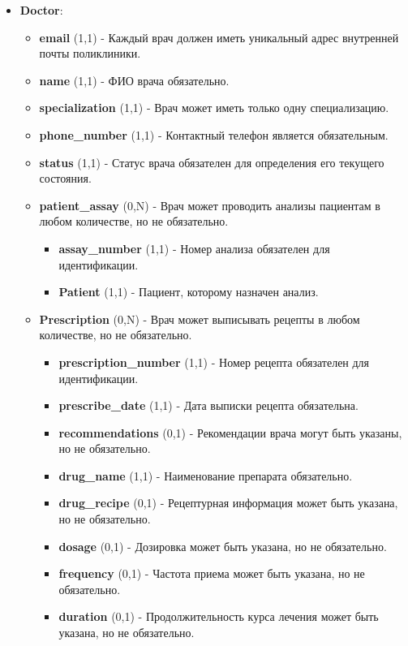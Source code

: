 \documentclass[a4paper, 14pt]{extarticle}
\begin{document}
\begin{itemize}
    \item \textbf{Doctor}: 
    \begin{itemize}
        \item \textbf{email} (1,1) - Каждый врач должен иметь уникальный адрес внутренней почты поликлиники.
        \item \textbf{name} (1,1) - ФИО врача обязательно.
        \item \textbf{specialization} (1,1) - Врач может иметь только одну специализацию.
        \item \textbf{phone\_number} (1,1) - Контактный телефон является обязательным.
        \item \textbf{status} (1,1) - Статус врача обязателен для определения его текущего состояния.
        \item \textbf{patient\_assay} (0,N) - Врач может проводить анализы пациентам в любом количестве, но не обязательно.
        \begin{itemize}
            \item \textbf{assay\_number} (1,1) - Номер анализа обязателен для идентификации.
            \item \textbf{Patient} (1,1) - Пациент, которому назначен анализ.
        \end{itemize}
        \item \textbf{Prescription} (0,N) - Врач может выписывать рецепты в любом количестве, но не обязательно.
        \begin{itemize}
            \item \textbf{prescription\_number} (1,1) - Номер рецепта обязателен для идентификации.
            \item \textbf{prescribe\_date} (1,1) - Дата выписки рецепта обязательна.
            \item \textbf{recommendations} (0,1) - Рекомендации врача могут быть указаны, но не обязательно.
            \item \textbf{drug\_name} (1,1) - Наименование препарата обязательно.
            \item \textbf{drug\_recipe} (0,1) - Рецептурная информация может быть указана, но не обязательно.
            \item \textbf{dosage} (0,1) - Дозировка может быть указана, но не обязательно.
            \item \textbf{frequency} (0,1) - Частота приема может быть указана, но не обязательно.
            \item \textbf{duration} (0,1) - Продолжительность курса лечения может быть указана, но не обязательно.

\end{itemize}
\end{itemize}
\end{itemize}
\end{document}
